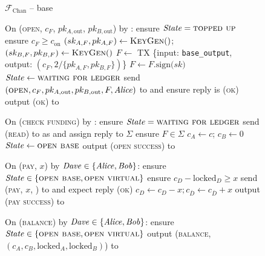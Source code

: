 \begin{figure}[H]
  \begin{systembox}{$\mathcal{F}_{\mathrm{Chan}}$ -- base}
    \begin{algorithmic}[1]
      \State On (\textsc{open}, $c_F$, $pk_{A, \mathrm{out}}$, $pk_{B,
      \mathrm{out}}$) by \alice:
      \Indent
        \State ensure $\mathit{State} = \textsc{topped up}$
        \State ensure $c_F \geq c_{\mathrm{on}}$
        \State $(sk_{A, F}, pk_{A, F}) \gets \textsc{KeyGen}()$; $(sk_{B, F},
        pk_{B, F}) \gets \textsc{KeyGen}()$
        \State $F \gets$ TX \{input: \texttt{base\_output}, output: $(c_F,
        2/\{pk_{A, F}, pk_{B, F}\})$\}
        \State $F \gets F\mathrm{.sign(}sk\mathrm{)}$
        \State $\mathit{State} \gets \textsc{waiting for ledger}$
        \State send $(\textsc{open}, c_F, pk_{A, \mathrm{out}}, pk_{B,
        \mathrm{out}}, F, \mathit{Alice})$ to \adversary and ensure reply is
        (\textsc{ok})
        \State output (\textsc{ok}) to \alice
      \EndIndent
      \Statex

      \State On (\textsc{check funding}) by \alice:
      \Indent
        \State ensure $\mathit{State} = \textsc{waiting for ledger}$
        \State send (\textsc{read}) to \ledger as \alice and assign reply to
        $\Sigma$
        \State ensure $F \in \Sigma$
        \State $c_A \gets c$; $c_B \gets 0$
        \State $\mathit{State} \gets \textsc{open base}$
        \State output (\textsc{open success}) to \alice
      \EndIndent
      \Statex

      \State On (\textsc{pay}, $x$) by $\mathit{Dave} \in \{\mathit{Alice}, \mathit{Bob}\}$:
      \Indent
        \State ensure $\mathit{State} \in \{\textsc{open base}, \textsc{open
        virtual}\}$
        \State ensure $c_D - \mathrm{locked}_D \geq x$
        \State send (\textsc{pay}, $x$, \dave) to \adversary and expect reply
        (\textsc{ok})
        \State $c_D \gets c_D - x; c_{\bar{D}} \gets c_{\bar{D}} + x$
        \State output (\textsc{pay success}) to \dave
      \EndIndent
      \Statex

      \State On (\textsc{balance}) by $\mathit{Dave} \in \{\mathit{Alice}, \mathit{Bob}\}$:
      \Indent
        \State ensure $\mathit{State} \in \{\textsc{open base}, \textsc{open
        virtual}\}$
        \State output (\textsc{balance}, $(c_A, c_B, \mathrm{locked}_A,
        \mathrm{locked}_B)$) to \dave %
      \EndIndent
    \end{algorithmic}
  \end{systembox}
  \caption{}
  \label{code:functionality:chan:skeleton:base}
\end{figure}

